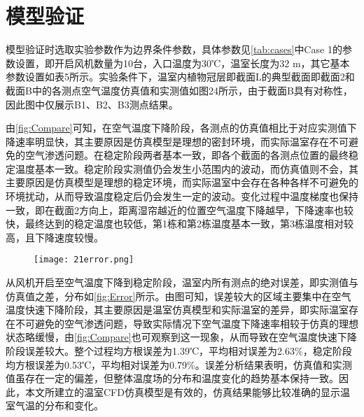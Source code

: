 \section{模型验证}
模型验证时选取实验参数作为边界条件参数，具体参数见\ref{tab:cases}中Case 1的参数设置，即开启风机数量为10台，入口温度为30℃，温室长度为32 m，其它基本参数设置如表5所示。实验条件下，温室内植物冠层即截面L的典型截面即截面2和截面B中的各测点空气温度仿真值和实测值如图24所示，由于截面B具有对称性，因此图中仅展示B1、B2、B3测点结果。
	\begin{figure}[!htbp]
		\centering
 	\end{figure}
由\ref{fig:Compare}可知，在空气温度下降阶段，各测点的仿真值相比于对应实测值下降速率明显快，其主要原因是仿真模型是理想的密封环境，而实际温室存在不可避免的空气渗透问题。在稳定阶段两者基本一致，即各个截面的各测点位置的最终稳定温度基本一致。稳定阶段实测值仍会发生小范围内的波动，而仿真值则不会，其主要原因是仿真模型是理想的稳定环境，而实际温室中会存在各种各样不可避免的环境扰动，从而导致温度稳定后仍会发生一定的波动。变化过程中温度梯度也保持一致，即在截面2方向上，距离湿帘越近的位置空气温度下降越早，下降速率也较快，最终达到的稳定温度也较低，第1栋和第2栋温度基本一致，第3栋温度相对较高，且下降速度较慢。
	\begin{figure}[!htbp]
		\centering
		\texttt{[image: 21error.png]}
	\end{figure}
从风机开启至空气温度下降到稳定阶段，温室内所有测点的绝对误差，即实测值与仿真值之差，分布如\ref{fig:Error}所示。由图可知，误差较大的区域主要集中在空气温度快速下降阶段，其主要原因是温室仿真模型和实际温室的差异，即实际温室存在不可避免的空气渗透问题，导致实际情况下空气温度下降速率相较于仿真的理想状态略缓慢，由\ref{fig:Compare}也可观察到这一现象，从而导致在空气温度快速下降阶段误差较大。整个过程均方根误差为1.39℃，平均相对误差为2.63\%，稳定阶段均方根误差为0.53℃，平均相对误差为0.79\%。误差分析结果表明，仿真值和实测值虽存在一定的偏差，但整体温度场的分布和温度变化的趋势基本保持一致。因此，本文所建立的温室CFD仿真模型是有效的，仿真结果能够比较准确的显示温室气温的分布和变化。

